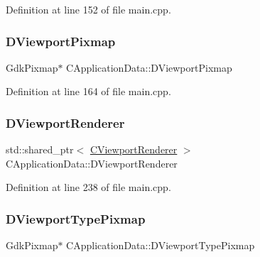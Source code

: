 Definition at line 152 of file main.\+cpp.

\hypertarget{classCApplicationData_ac8801e116d0c49776c9f3db7415287fe}{}\label{classCApplicationData_ac8801e116d0c49776c9f3db7415287fe} 
\subsubsection{\texorpdfstring{D\+Viewport\+Pixmap}{DViewportPixmap}}
{\footnotesize\ttfamily Gdk\+Pixmap$\ast$ C\+Application\+Data\+::\+D\+Viewport\+Pixmap\hspace{0.3cm}{\ttfamily [protected]}}



Definition at line 164 of file main.\+cpp.

\hypertarget{classCApplicationData_a31da050ebca942272344c8b736d72848}{}\label{classCApplicationData_a31da050ebca942272344c8b736d72848} 
\subsubsection{\texorpdfstring{D\+Viewport\+Renderer}{DViewportRenderer}}
{\footnotesize\ttfamily std\+::shared\+\_\+ptr$<$ \hyperlink{classCViewportRenderer}{C\+Viewport\+Renderer} $>$ C\+Application\+Data\+::\+D\+Viewport\+Renderer\hspace{0.3cm}{\ttfamily [protected]}}



Definition at line 238 of file main.\+cpp.

\hypertarget{classCApplicationData_a3a71a311e7bf0d4a002412343f69e794}{}\label{classCApplicationData_a3a71a311e7bf0d4a002412343f69e794} 
\subsubsection{\texorpdfstring{D\+Viewport\+Type\+Pixmap}{DViewportTypePixmap}}
{\footnotesize\ttfamily Gdk\+Pixmap$\ast$ C\+Application\+Data\+::\+D\+Viewport\+Type\+Pixmap\hspace{0.3cm}{\ttfamily [protected]}}



